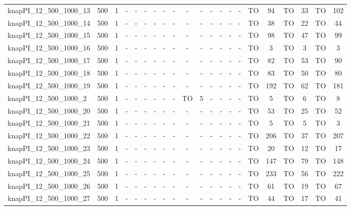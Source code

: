 \begin{sidewaystable}[!ht]
{\begin{tabular}{lcccccccccccccccccccc}
knapPI\_12\_500\_1000\_13 & 500 & 1 &  - &  - &  - &  - &  - &  - &  - &  - &  - &  - &  - &  - & TO & 94 & TO & 33 & TO & 102 \\
knapPI\_12\_500\_1000\_14 & 500 & 1 &  - &  - &  - &  - &  - &  - &  - &  - &  - &  - &  - &  - & TO & 38 & TO & 22 & TO & 44 \\
knapPI\_12\_500\_1000\_15 & 500 & 1 &  - &  - &  - &  - &  - &  - &  - &  - &  - &  - &  - &  - & TO & 98 & TO & 47 & TO & 99 \\
knapPI\_12\_500\_1000\_16 & 500 & 1 &  - &  - &  - &  - &  - &  - &  - &  - &  - &  - &  - &  - & TO & 3 & TO & 3 & TO & 3 \\
knapPI\_12\_500\_1000\_17 & 500 & 1 &  - &  - &  - &  - &  - &  - &  - &  - &  - &  - &  - &  - & TO & 82 & TO & 53 & TO & 90 \\
knapPI\_12\_500\_1000\_18 & 500 & 1 &  - &  - &  - &  - &  - &  - &  - &  - &  - &  - &  - &  - & TO & 83 & TO & 50 & TO & 80 \\
knapPI\_12\_500\_1000\_19 & 500 & 1 &  - &  - &  - &  - &  - &  - &  - &  - &  - &  - &  - &  - & TO & 192 & TO & 62 & TO & 181 \\
knapPI\_12\_500\_1000\_2 & 500 & 1 &  - &  - &  - &  - &  - &  - & TO & 5 &  - &  - &  - &  - & TO & 5 & TO & 6 & TO & 8 \\
knapPI\_12\_500\_1000\_20 & 500 & 1 &  - &  - &  - &  - &  - &  - &  - &  - &  - &  - &  - &  - & TO & 53 & TO & 25 & TO & 52 \\
knapPI\_12\_500\_1000\_21 & 500 & 1 &  - &  - &  - &  - &  - &  - &  - &  - &  - &  - &  - &  - & TO & 5 & TO & 5 & TO & 3 \\
knapPI\_12\_500\_1000\_22 & 500 & 1 &  - &  - &  - &  - &  - &  - &  - &  - &  - &  - &  - &  - & TO & 206 & TO & 37 & TO & 207 \\
knapPI\_12\_500\_1000\_23 & 500 & 1 &  - &  - &  - &  - &  - &  - &  - &  - &  - &  - &  - &  - & TO & 20 & TO & 12 & TO & 17 \\
knapPI\_12\_500\_1000\_24 & 500 & 1 &  - &  - &  - &  - &  - &  - &  - &  - &  - &  - &  - &  - & TO & 147 & TO & 79 & TO & 148 \\
knapPI\_12\_500\_1000\_25 & 500 & 1 &  - &  - &  - &  - &  - &  - &  - &  - &  - &  - &  - &  - & TO & 233 & TO & 56 & TO & 222 \\
knapPI\_12\_500\_1000\_26 & 500 & 1 &  - &  - &  - &  - &  - &  - &  - &  - &  - &  - &  - &  - & TO & 61 & TO & 19 & TO & 67 \\
knapPI\_12\_500\_1000\_27 & 500 & 1 &  - &  - &  - &  - &  - &  - &  - &  - &  - &  - &  - &  - & TO & 44 & TO & 17 & TO & 41 \\

\end{tabular}}
\end{sidewaystable}

